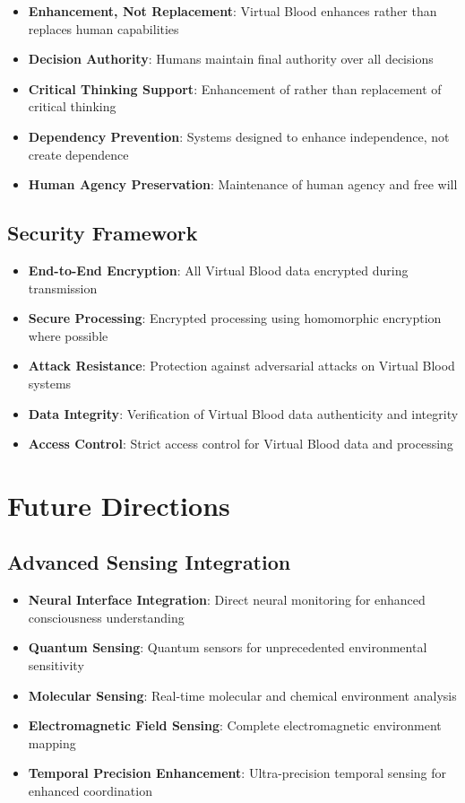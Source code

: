 \documentclass[12pt,a4paper]{article}
\begin{document}
\begin{itemize}
\item \textbf{Enhancement, Not Replacement}: Virtual Blood enhances rather than replaces human capabilities
\item \textbf{Decision Authority}: Humans maintain final authority over all decisions
\item \textbf{Critical Thinking Support}: Enhancement of rather than replacement of critical thinking
\item \textbf{Dependency Prevention}: Systems designed to enhance independence, not create dependence
\item \textbf{Human Agency Preservation}: Maintenance of human agency and free will
\end{itemize}

\subsection{Security Framework}

\begin{itemize}
\item \textbf{End-to-End Encryption}: All Virtual Blood data encrypted during transmission
\item \textbf{Secure Processing}: Encrypted processing using homomorphic encryption where possible
\item \textbf{Attack Resistance}: Protection against adversarial attacks on Virtual Blood systems
\item \textbf{Data Integrity}: Verification of Virtual Blood data authenticity and integrity
\item \textbf{Access Control}: Strict access control for Virtual Blood data and processing
\end{itemize}

\section{Future Directions}

\subsection{Advanced Sensing Integration}

\begin{itemize}
\item \textbf{Neural Interface Integration}: Direct neural monitoring for enhanced consciousness understanding
\item \textbf{Quantum Sensing}: Quantum sensors for unprecedented environmental sensitivity
\item \textbf{Molecular Sensing}: Real-time molecular and chemical environment analysis
\item \textbf{Electromagnetic Field Sensing}: Complete electromagnetic environment mapping
\item \textbf{Temporal Precision Enhancement}: Ultra-precision temporal sensing for enhanced coordination
\end{itemize}
\end{document}
